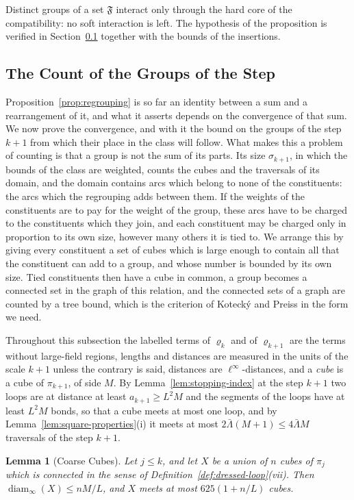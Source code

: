 \documentclass[11pt]{preprint}
\newcommand{\diam}{\operatorname{diam}}
\numberwithin{equation}{section}
\newtheorem{lemma}[theorem]{Lemma}
\theoremstyle{definition}
\theoremstyle{remark}
\theoremstyle{plain}
\begin{document}
Distinct groups of a set $\mathfrak F$ interact only through the hard core of the compatibility: no soft interaction is left. The hypothesis of the proposition is verified in Section~\ref{sec:count} together with the bounds of the insertions.

\subsection{The Count of the Groups of the Step}\label{sec:count}

Proposition~\ref{prop:regrouping} is so far an identity between a sum and a rearrangement of it, and what it asserts depends on the convergence of that sum. We now prove the convergence, and with it the bound on the groups of the step $k + 1$ from which their place in the class will follow. What makes this a problem of counting is that a group is not the sum of its parts. Its size $\sigma_{k+1}$, in which the bounds of the class are weighted, counts the cubes and the traversals of its domain, and the domain contains arcs which belong to none of the constituents: the arcs which the regrouping adds between them. If the weights of the constituents are to pay for the weight of the group, these arcs have to be charged to the constituents which they join, and each constituent may be charged only in proportion to its own size, however many others it is tied to. We arrange this by giving every constituent a set of cubes which is large enough to contain all that the constituent can add to a group, and whose number is bounded by its own size. Tied constituents then have a cube in common, a group becomes a connected set in the graph of this relation, and the connected sets of a graph are counted by a tree bound, which is the criterion of Koteck\'y and Preiss in the form we need.

Throughout this subsection the labelled terms of $\varrho_k$ and of $\varrho_{k+1}$ are the terms without large-field regions, lengths and distances are measured in the units of the scale $k + 1$ unless the contrary is said, distances are $\ell^\infty$-distances, and a \emph{cube} is a cube of $\pi_{k+1}$, of side $M$. By Lemma~\ref{lem:stopping-index} at the step $k + 1$ two loops are at distance at least $a_{k+1} \geq L^2M$ and the segments of the loops have at least $L^2M$ bonds, so that a cube meets at most one loop, and by Lemma~\ref{lem:square-properties}(i) it meets at most $2\bar\Lambda(M + 1) \leq 4\bar\Lambda M$ traversals of the step $k + 1$.

\begin{lemma}[Coarse Cubes]\label{lem:coarse-cubes}
Let $j \leq k$, and let $X$ be a union of $n$ cubes of $\pi_j$ which is connected in the sense of Definition~\ref{def:dressed-loop}(vii). Then $\diam_\infty(X) \leq nM/L$, and $X$ meets at most $625(1 + n/L)$ cubes.
\end{lemma}
\end{document}
